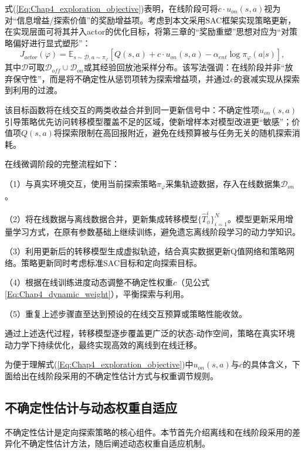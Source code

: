 式(\ref{Eq:Chap4_exploration_objective})表明，在线阶段可将$c\cdot u_{on}(s,a)$视为对“信息增益/探索价值”的奖励增益项。考虑到本文采用SAC框架实现策略更新，在实现层面可将其并入actor的优化目标，将第三章的“奖励重塑”思想对应为“对策略偏好进行显式塑形”：
\begin{equation}\label{Eq:Chap4_actor_augmented}
  J_{actor}(\varphi) = \mathbb{E}_{s \sim \mathcal{D}, a \sim \pi_\varphi}[Q(s,a) + c\cdot u_{on}(s,a) - \alpha_{ent}\log \pi_\varphi(a|s)],
\end{equation}
其中$\mathcal{D}$可取$\mathcal{D}_{off}\cup\mathcal{D}_{on}$或其经验回放池采样分布。该写法强调：在线阶段并非“放弃保守性”，而是将不确定性从惩罚项转为探索增益项，并通过$c$的衰减实现从探索到利用的过渡。

该目标函数将在线交互的两类收益合并到同一更新信号中：不确定性项$u_{on}(s, a)$引导策略优先访问转移模型覆盖不足的区域，使新增样本对模型改进更“敏感”；价值项$Q(s, a)$将探索限制在高回报附近，避免在线预算被与任务无关的随机探索消耗。

在线微调阶段的完整流程如下：

（1）与真实环境交互，使用当前探索策略$\pi_\varphi$采集轨迹数据，存入在线数据集$\mathcal{D}_{on}$。

（2）将在线数据与离线数据合并，更新集成转移模型$\{\hat{T}_\phi^i\}_{i=1}^N$。模型更新采用增量学习方式，在原有参数基础上继续训练，避免遗忘离线阶段学习的动力学知识。

（3）利用更新后的转移模型生成虚拟轨迹，结合真实数据更新Q值网络和策略网络。策略更新同时考虑标准SAC目标和定向探索目标。

（4）根据在线训练进度动态调整不确定性权重$c$（见公式\ref{Eq:Chap4_dynamic_weight}），平衡探索与利用。

（5）重复上述步骤直至达到预设的在线交互预算或策略性能收敛。

通过上述迭代过程，转移模型逐步覆盖更广泛的状态-动作空间，策略在真实环境动力学下持续优化，最终实现高效的离线到在线迁移。

为便于理解式(\ref{Eq:Chap4_exploration_objective})中$u_{on}(s,a)$与$c$的具体含义，下面给出在线阶段采用的不确定性估计方式与权重调节规则。

\subsection{不确定性估计与动态权重自适应}\label{Sec4.2.3}

不确定性估计是定向探索策略的核心组件。本节首先介绍离线和在线阶段采用的差异化不确定性估计方法，随后阐述动态权重自适应机制。



